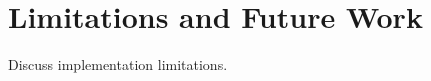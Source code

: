 \section{Limitations and Future Work}
\label{sec:limitations}

Discuss implementation limitations.

\newpage

